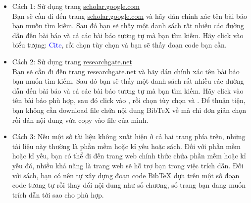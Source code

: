 \begin{itemize}
	\item Cách 1: Sử dụng trang \href{https://scholar.google.com}{scholar.google.com}\\
	Bạn sẽ cần đi đến trang \href{https://scholar.google.com}{scholar.google.com} và hãy dán chính xác tên bài báo bạn muốn tìm kiếm. Sau đó bạn sẽ thấy một danh sách rất nhiều các đường dẫn đến bài báo và cả các bài báo tương tự mà bạn tìm kiếm. Hãy click vào biểu tượng: \textcolor{blue}{\faQuoteRight\;Cite}, rồi chọn tùy chọn  và bạn sẽ thấy đoạn code bạn cần.
	\item Cách 2: Sử dụng trang \href{https://www.researchgate.net/search}{researchgate.net}\\
	Bạn sẽ cần đi đến trang \href{https://www.researchgate.net/search}{researchgate.net} và hãy dán chính xác tên bài báo bạn muốn tìm kiếm. Sau đó bạn sẽ thấy một danh sách rất nhiều các đường dẫn đến bài báo và cả các bài báo tương tự mà bạn tìm kiếm. Hãy click vào tên bài báo phù hợp, sau đó click vào , rồi chọn tùy chọn  và . Để thuận tiện, bạn không cần download file chứa nội dung BibTeX về mà chỉ đơn giản chọn  rồi dán nội dung vừa copy vào file  của mình.
	\item Cách 3: Nếu một số tài liệu không xuất hiện ở cả hai trang phía trên, những tài liệu này thường là phần mềm hoặc kỉ yếu hoặc sách. Đối với phần mềm hoặc kỉ yếu, bạn có thể đi đến trang web chính thức chứa phần mềm hoặc kỉ yếu đó, nhiều khả năng là trang web sẽ hỗ trợ bạn trong việc trích dẫn. Đối với sách, bạn có nên tự xây dựng đoạn code BibTeX dựa trên một số đoạn code tương tự rồi thay đổi nội dung như số chương, số trang bạn đang muốn trích dẫn tới sao cho phù hợp.
\end{itemize}






